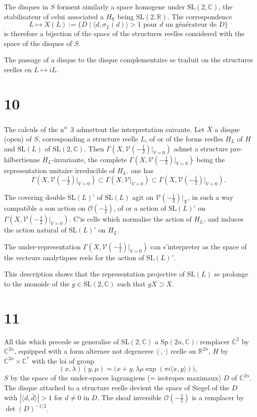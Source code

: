 \documentclass[12pt,a4paper]{article}
\theoremstyle{plain}
\theoremstyle{definition}
\theoremstyle{remark}
\begin{document}
The disques in $S$ forment similarly a space homogene under $\mathrm{SL}(2, \mathbb{C})$, the stabilisateur of celui associated a $H_\mathbb{R}$ being $\mathrm{SL}(2, \mathbb{R})$. The correspondence
\[L \mapsto X(L) := \{D \mid \langle d, \sigma_L(d) \rangle > 1 \text{ pour } d \text{ un générateur de } D\}\]
is therefore a bijection of the space of the structures reelles considered with the space of the disques of $S$.

The passage of a disque to the disque complementaire se traduit on the structures reelles en $L \mapsto iL$.

\section*{10}

The calculs of the n\textsuperscript{o}~3 admettent the interpretation suivante. Let $X$ a disque (open) of $S$, corresponding a structure reelle $L$, of or of the forms reelles $H_L$ of $H$ and $\mathrm{SL}(L)$ of $\mathrm{SL}(2, \mathbb{C})$. Then $\Gamma(X, \mathscr{V}(-\frac{1}{2})|_{V=0})$ admet a structure pre-hilbertienne $H_L$-invariante, the complete $\Gamma(X, \mathscr{V}(-\frac{1}{2})|_{V=0})\hat{}$ being the representation unitaire irreducible of $H_L$. one has
\[\Gamma(X, \mathscr{V}(-\tfrac{1}{2})|_{V=0}) \subset \Gamma(X, \mathscr{V}|_{V=0}) \subset \Gamma(X, \mathscr{V}(-\tfrac{1}{2})|_{V=0})\hat{}.\]

The covering double $\mathrm{SL}(L)'$ of $\mathrm{SL}(L)$ agit on $\mathscr{V}(-\frac{1}{2})|_X$, in such a way compatible a son action on $\mathcal{O}(-\frac{1}{2})$, of or a action of $\mathrm{SL}(L)'$ on $\Gamma(X, \mathscr{V}(-\frac{1}{2})|_{V=0})$. C'is celle which normalise the action of $H_L$, and induces the action natural of $\mathrm{SL}(L)'$ on $H_L$.

The under-representation $\Gamma(X, \mathscr{V}(-\frac{1}{2})|_{V=0})$ can s'interpreter as the space of the vecteurs analytiques reels for the action of $\mathrm{SL}(L)'$.

This description shows that the representation projective of $\mathrm{SL}(L)$ se prolonge to the monoide of the $g \in \mathrm{SL}(2, \mathbb{C})$ such that $gX \supset X$.

\section*{11}

All this which precede se generalise of $\mathrm{SL}(2, \mathbb{C})$ a $\mathrm{Sp}(2n, \mathbb{C})$: remplacer $\mathbb{C}^2$ by $\mathbb{C}^{2n}$, equipped with a form alternee not degeneree $\langle \cdot, \cdot \rangle$ reelle on $\mathbb{R}^{2n}$, $H$ by $\mathbb{C}^{2n} \times \mathbb{C}^*$ with the loi of group
\[(x, \lambda)(y, \mu) = \bigl(x + y, \lambda\mu\exp(\pi i\langle x, y \rangle)\bigr),\]
$S$ by the space of the under-spaces lagrangiens (= isotropes maximaux) $D$ of $\mathbb{C}^{2n}$. The disque attached to a structure reelle devient the space of Siegel of the $D$ with $|\langle d, \bar{d} \rangle| > 1$ for $d \neq 0$ in $D$. The sheaf inversible $\mathcal{O}(-\frac{1}{2})$ is a remplacer by $\det(D)^{-1/2}$.
\end{document}
